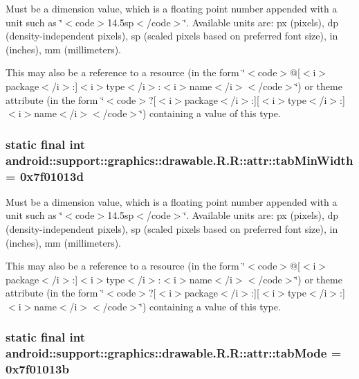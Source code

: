 Must be a dimension value, which is a floating point number appended with a unit such as \char`\"{}$<$code$>$14.5sp$<$/code$>$\char`\"{}. Available units are: px (pixels), dp (density-independent pixels), sp (scaled pixels based on preferred font size), in (inches), mm (millimeters). 

This may also be a reference to a resource (in the form \char`\"{}$<$code$>$@\mbox{[}$<$i$>$package$<$/i$>$:\mbox{]}$<$i$>$type$<$/i$>$:$<$i$>$name$<$/i$>$$<$/code$>$\char`\"{}) or theme attribute (in the form \char`\"{}$<$code$>$?\mbox{[}$<$i$>$package$<$/i$>$:\mbox{]}\mbox{[}$<$i$>$type$<$/i$>$:\mbox{]}$<$i$>$name$<$/i$>$$<$/code$>$\char`\"{}) containing a value of this type. \hypertarget{classandroid_1_1support_1_1graphics_1_1drawable_1_1_r_1_1attr_1d735bc6773e8f6fea31495a5588fe2e}{
\subsubsection[{tabMinWidth}]{\setlength{\rightskip}{0pt plus 5cm}static final int android::support::graphics::drawable.R.R::attr::tabMinWidth = 0x7f01013d}}
\label{classandroid_1_1support_1_1graphics_1_1drawable_1_1_r_1_1attr_1d735bc6773e8f6fea31495a5588fe2e}


Must be a dimension value, which is a floating point number appended with a unit such as \char`\"{}$<$code$>$14.5sp$<$/code$>$\char`\"{}. Available units are: px (pixels), dp (density-independent pixels), sp (scaled pixels based on preferred font size), in (inches), mm (millimeters). 

This may also be a reference to a resource (in the form \char`\"{}$<$code$>$@\mbox{[}$<$i$>$package$<$/i$>$:\mbox{]}$<$i$>$type$<$/i$>$:$<$i$>$name$<$/i$>$$<$/code$>$\char`\"{}) or theme attribute (in the form \char`\"{}$<$code$>$?\mbox{[}$<$i$>$package$<$/i$>$:\mbox{]}\mbox{[}$<$i$>$type$<$/i$>$:\mbox{]}$<$i$>$name$<$/i$>$$<$/code$>$\char`\"{}) containing a value of this type. \hypertarget{classandroid_1_1support_1_1graphics_1_1drawable_1_1_r_1_1attr_ea1627caa1d4697d55aed790602e40f7}{
\subsubsection[{tabMode}]{\setlength{\rightskip}{0pt plus 5cm}static final int android::support::graphics::drawable.R.R::attr::tabMode = 0x7f01013b}}
\label{classandroid_1_1support_1_1graphics_1_1drawable_1_1_r_1_1attr_ea1627caa1d4697d55aed790602e40f7}


